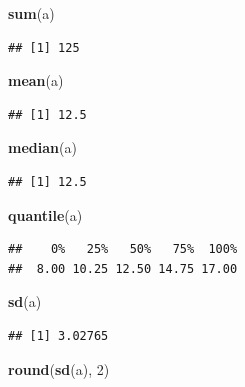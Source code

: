 \documentclass[]{book}
\newenvironment{Shaded}{\begin{snugshade}}{\end{snugshade}}
\newcommand{\KeywordTok}[1]{\textcolor[rgb]{0.13,0.29,0.53}{\textbf{#1}}}
\newcommand{\DecValTok}[1]{\textcolor[rgb]{0.00,0.00,0.81}{#1}}
\newcommand{\NormalTok}[1]{#1}
\begin{document}
\begin{Shaded}
\begin{Highlighting}[]
\KeywordTok{sum}\NormalTok{(a)}
\end{Highlighting}
\end{Shaded}

\begin{verbatim}
## [1] 125
\end{verbatim}

\begin{Shaded}
\begin{Highlighting}[]
\KeywordTok{mean}\NormalTok{(a)}
\end{Highlighting}
\end{Shaded}

\begin{verbatim}
## [1] 12.5
\end{verbatim}

\begin{Shaded}
\begin{Highlighting}[]
\KeywordTok{median}\NormalTok{(a)}
\end{Highlighting}
\end{Shaded}

\begin{verbatim}
## [1] 12.5
\end{verbatim}

\begin{Shaded}
\begin{Highlighting}[]
\KeywordTok{quantile}\NormalTok{(a)}
\end{Highlighting}
\end{Shaded}

\begin{verbatim}
##    0%   25%   50%   75%  100% 
##  8.00 10.25 12.50 14.75 17.00
\end{verbatim}

\begin{Shaded}
\begin{Highlighting}[]
\KeywordTok{sd}\NormalTok{(a)}
\end{Highlighting}
\end{Shaded}

\begin{verbatim}
## [1] 3.02765
\end{verbatim}

\begin{Shaded}
\begin{Highlighting}[]
\KeywordTok{round}\NormalTok{(}\KeywordTok{sd}\NormalTok{(a), }\DecValTok{2}\NormalTok{)}
\end{Highlighting}
\end{Shaded}
\end{document}
